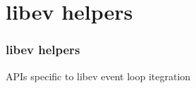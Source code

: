 \hypertarget{group__ev}{}\section{libev helpers}
\label{group__ev}
\subsubsection*{libev helpers}

A\+P\+Is specific to libev event loop itegration 